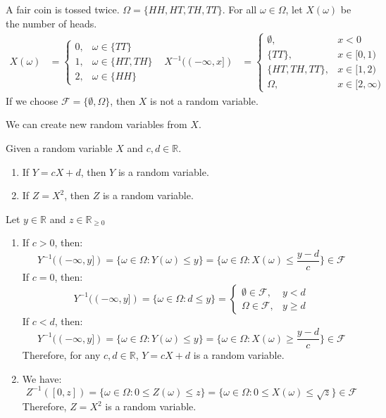 \documentclass{huhtakm-template-book}
\begin{document}
\newpage
\begin{eg}
	\label{Toss coin twice}
	A fair coin is tossed twice. $\Omega=\{HH,HT,TH,TT\}$. For all $\omega\in\Omega$, let $X(\omega)$ be the number of heads.
	\begin{align*}
		X(\omega)&=\begin{cases}
			0, &\omega\in\{TT\}\\
			1, &\omega\in\{HT,TH\}\\
			2, &\omega\in\{HH\}
		\end{cases} & X^{-1}((-\infty,x])&=\begin{cases}
			\emptyset, & x<0\\
			\{TT\}, & x\in[0,1)\\
			\{HT,TH,TT\}, & x\in[1,2)\\
			\Omega, &x\in[2,\infty)
		\end{cases}
	\end{align*}
	If we choose $\mathcal{F}=\{\emptyset,\Omega\}$, then $X$ is not a random variable.
\end{eg}
We can create new random variables from $X$.
\begin{lem}
	Given a random variable $X$ and $c,d\in\mathbb{R}$.
	\begin{enumerate}
		\item If $Y=cX+d$, then $Y$ is a random variable.
		\item If $Z=X^{2}$, then $Z$ is a random variable.
	\end{enumerate}
\end{lem} 
\begin{proofing}
	Let $y\in\mathbb{R}$ and $z\in\mathbb{R}_{\geq 0}$
	\begin{enumerate}
		\item If $c>0$, then:
		\begin{equation*}
			Y^{-1}((-\infty,y])=\{\omega\in\Omega:Y(\omega)\leq y\}=\{\omega\in\Omega:X(\omega)\leq\frac{y-d}{c}\}\in\mathcal{F}
		\end{equation*}
		If $c=0$, then:
		\begin{equation*}
			Y^{-1}((-\infty,y])=\{\omega\in\Omega:d\leq y\}=\begin{cases}
				\emptyset\in\mathcal{F}, &y<d\\
				\Omega\in\mathcal{F}, &y\geq d
			\end{cases}
		\end{equation*}
		If $c<d$, then:
		\begin{equation*}
			Y^{-1}((-\infty,y])=\{\omega\in\Omega:Y(\omega)\leq y\}=\{\omega\in\Omega:X(\omega)\geq\frac{y-d}{c}\}\in\mathcal{F}
		\end{equation*}
		Therefore, for any $c,d\in\mathbb{R}$, $Y=cX+d$ is a random variable.
		\item We have:
		\begin{equation*}
			Z^{-1}([0,z])=\{\omega\in\Omega:0\leq Z(\omega)\leq z\}=\{\omega\in\Omega:0\leq X(\omega)\leq\sqrt{z}\}\in\mathcal{F}
		\end{equation*}
		Therefore, $Z=X^{2}$ is a random variable.
	\end{enumerate}
\end{proofing}
\end{document}
